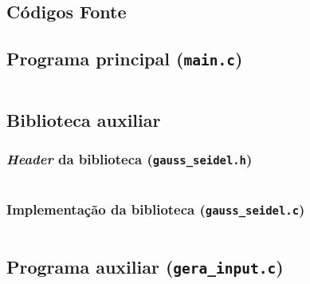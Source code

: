 \begin{apendicesenv}

\partapendices

\chapter{Códigos Fonte}
\label{ch:codigos_fonte}
	\section{Programa principal (\texttt{main.c})}
		\label{sec:main.c}
		\inputminted[autogobble,breaklines,linenos,frame=lines,tabsize=4,obeytabs=true,fontsize=\footnotesize
		]{c}{source_codes/main.c}

	\section{Biblioteca auxiliar}
		\subsection{\emph{Header} da biblioteca (\texttt{gauss\_seidel.h})}
		\label{sec:gauss_seidel.h}
			\inputminted[autogobble,breaklines,linenos,frame=lines,tabsize=4,obeytabs=true,fontsize=\footnotesize
			]{c}{source_codes/gauss_seidel.h}

		\subsection{Implementação da biblioteca (\texttt{gauss\_seidel.c})}
			\label{sec:gauss_seidel.c}
			\inputminted[autogobble,breaklines,linenos,frame=lines,tabsize=4,obeytabs=true,fontsize=\footnotesize
			]{c}{source_codes/gauss_seidel.c}

	\section{Programa auxiliar (\texttt{gera\_input.c})}
		\label{sec:gera_input.c}
		\inputminted[autogobble,breaklines,linenos,frame=lines,tabsize=4,obeytabs=true,fontsize=\footnotesize
			]{c}{source_codes/gera_input.c}

\end{apendicesenv}